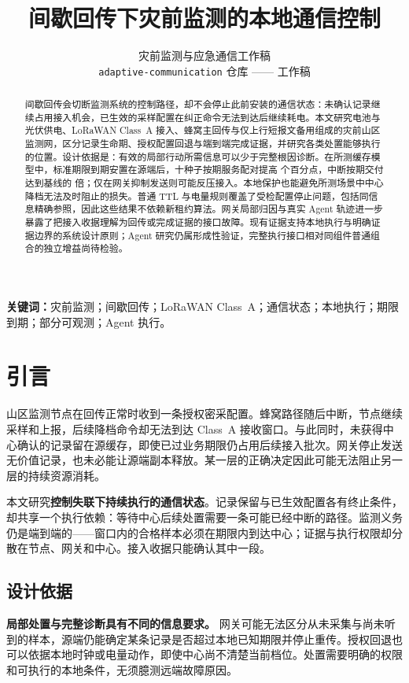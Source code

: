\documentclass[11pt]{article}
\title{\textbf{间歇回传下灾前监测的本地通信控制}}
\author{灾前监测与应急通信工作稿\\ \texttt{adaptive-communication} 仓库 —— 工作稿}
\date{}
\begin{document}
\maketitle

\begin{abstract}
间歇回传会切断监测系统的控制路径，却不会停止此前安装的通信状态：未确认记录继续占用接入机会，已生效的采样配置在纠正命令无法到达后继续耗电。本文研究电池与光伏供电、LoRaWAN Class~A 接入、蜂窝主回传与仅上行短报文备用组成的灾前山区监测网，区分记录生命期、授权配置回退与端到端完成证据，并研究各类处置能够执行的位置。设计依据是：有效的局部行动所需信息可以少于完整根因诊断。在所测缓存模型中，标准期限到期安置在源端后，十种子按期服务配对提高 \cThreePairedPoints 个百分点，中断按期交付达到基线的 \cThreeRatio 倍；仅在网关抑制发送则可能反压接入。本地保护也能避免所测场景中中心降档无法及时阻止的损失。普通 TTL 与电量规则覆盖了受检配置停止问题，包括同信息精确参照，因此这些结果不依赖新租约算法。网关局部归因与真实 Agent 轨迹进一步暴露了把接入收据理解为回传或完成证据的接口故障。现有证据支持本地执行与明确证据边界的系统设计原则；Agent 研究仍属形成性验证，完整执行接口相对同组件普通组合的独立增益尚待检验。
\end{abstract}

\noindent\textbf{关键词：}灾前监测；间歇回传；LoRaWAN Class~A；通信状态；本地执行；期限到期；部分可观测；Agent 执行。

\section{引言}
山区监测节点在回传正常时收到一条授权密采配置。蜂窝路径随后中断，节点继续采样和上报，后续降档命令却无法到达 Class~A 接收窗口。与此同时，未获得中心确认的记录留在源缓存，即使已过业务期限仍占用后续接入批次。网关停止发送无价值记录，也未必能让源端副本释放。某一层的正确决定因此可能无法阻止另一层的持续资源消耗。

本文研究\textbf{控制失联下持续执行的通信状态}。记录保留与已生效配置各有终止条件，却共享一个执行依赖：等待中心后续处置需要一条可能已经中断的路径。监测义务仍是端到端的——窗口内的合格样本必须在期限内到达中心；证据与执行权限却分散在节点、网关和中心。接入收据只能确认其中一段。

\subsection{设计依据}
\textbf{局部处置与完整诊断具有不同的信息要求。} 网关可能无法区分从未采集与尚未听到的样本，源端仍能确定某条记录是否超过本地已知期限并停止重传。授权回退也可以依据本地时钟或电量动作，即使中心尚不清楚当前档位。处置需要明确的权限和可执行的本地条件，无须臆测远端故障原因。
\end{document}
